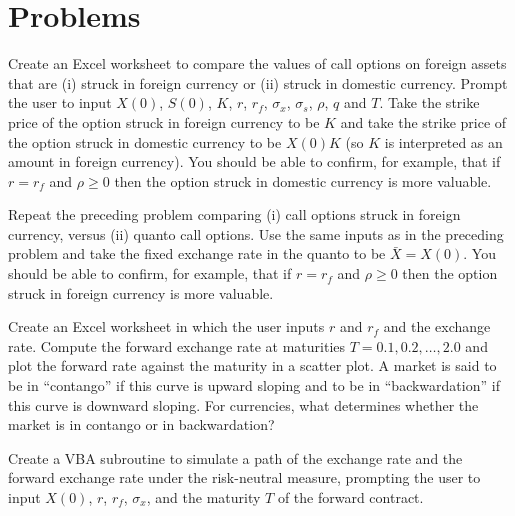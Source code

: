 \section*{Problems}
\begin{prob} Create an Excel worksheet to compare the values of call options on foreign assets that are (i) struck in foreign currency or (ii) struck in domestic currency.  Prompt the user to input $X(0)$, $S(0)$, $K$, $r$, $r_f$, $\sigma_x$, $\sigma_s$, $\rho$, $q$ and $T$.  Take the strike price of the option struck in foreign currency to be $K$ and take the strike price of the option struck in domestic currency to be $X(0)K$ (so $K$ is interpreted as an amount in foreign currency).  You should be able to confirm, for example, that if $r=r_f$ and $\rho \geq 0$ then the option struck in domestic currency is more valuable.
\end{prob}\begin{prob} Repeat the preceding problem comparing (i) call options struck in foreign currency, versus (ii) quanto call options.  Use the same inputs as in the preceding problem and take the fixed exchange rate in the quanto to be $\bar{X}=X(0)$.  You should be able to confirm, for example, that if $r=r_f$ and $\rho \geq 0$ then the option struck in foreign currency is more valuable.
\end{prob}\begin{prob} Create an Excel worksheet in which the user inputs $r$ and $r_f$ and the exchange rate.  Compute the forward exchange rate at maturities $T=0.1, 0.2, \dots, 2.0$ and plot the forward rate against the maturity in a scatter plot. A market is said to be in ``contango'' if this curve is upward sloping and to be in ``backwardation'' if this curve is downward sloping.  For currencies, what determines whether the market is in contango or in backwardation?
\end{prob}\begin{prob} Create a VBA subroutine to simulate a path of the exchange rate and the forward exchange rate under the risk-neutral measure, prompting the user to input $X(0)$, $r$, $r_f$, $\sigma_x$, and the maturity $T$ of the forward contract.

\end{prob}
